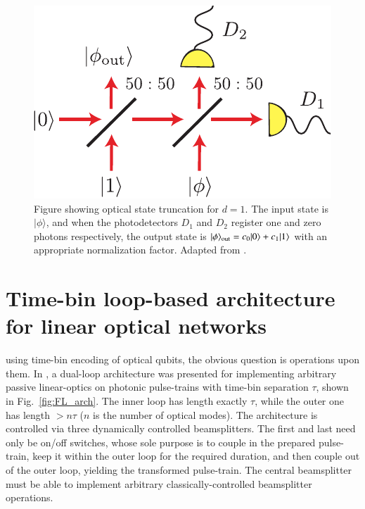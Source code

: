 \documentclass[times,final]{elsarticle}
\newcommand{\ket}[1]{|#1\rangle}
\newcommand{\sihui}[1]{{\color{red}{#1}}}
\begin{document}
\begin{figure}[!htb]
\centering
\includegraphics[width=0.3\columnwidth]{qscissors}
\caption{Figure showing optical state truncation for $d=1$. The input state is $\ket{\phi}$, and when the photodetectors $D_1$ and $D_2$ register one and zero photons respectively, the output state is $\ket{\phi}_{\rm out}=c_0\ket{0}+c_1\ket{1}$ with an appropriate normalization factor. Adapted from \cite{bib:Pegg98}.} \label{fig:qscissors}	
\end{figure}

\section{Time-bin loop-based architecture for linear optical networks}\label{sec:timebins}

\sihui{When} using time-bin encoding of optical qubits, the obvious question is\sihui{: how do we perform single-qubit and two-qubit} operations upon them. In \cite{bib:Motes14}, a dual-loop architecture was presented for implementing arbitrary passive linear-optics on photonic pulse-trains with time-bin separation $\tau$, shown in Fig.~\ref{fig:FL_arch}. The inner loop has length exactly $\tau$, while the outer one has length $>n\tau$ ($n$ is the 
number of optical modes). The architecture is controlled via three 
dynamically controlled beamsplitters. The first and last need only be on/off switches, whose sole purpose is to couple in the prepared pulse-train, 
keep it within the outer loop for the required duration, and then couple 
out of the outer loop, yielding the transformed pulse-train. The central 
beamsplitter must be able to implement arbitrary classically-controlled 
beamsplitter operations.
\end{document}
